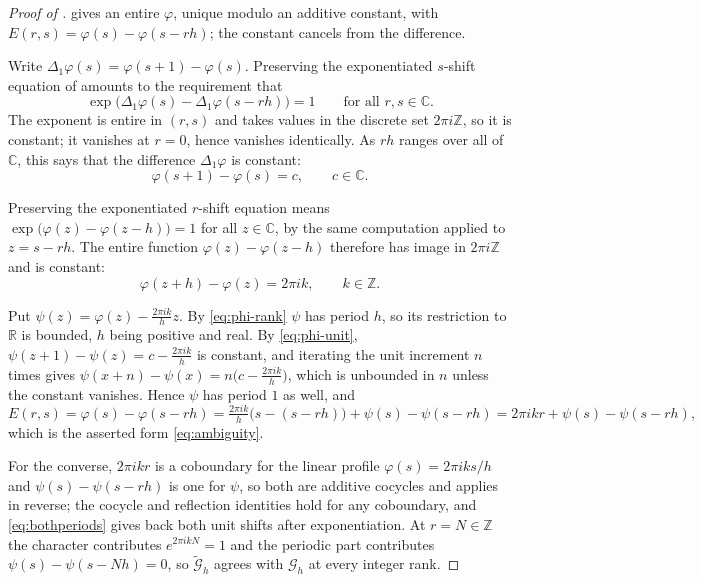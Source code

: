 \documentclass[11pt,letterpaper]{article}
\newcommand{\Gc}{\mathcal{G}}               %
\newcommand{\Zint}{\mathbb{Z}}
\newcommand{\Rr}{\mathbb{R}}
\newcommand{\Cc}{\mathbb{C}}
\begin{document}
\begin{proof}[Proof of ]
 gives an entire $\varphi$, unique modulo an additive
constant, with $E(r,s)=\varphi(s)-\varphi(s-rh)$; the constant cancels from the
difference.

Write $\Delta_1\varphi(s)=\varphi(s+1)-\varphi(s)$. Preserving the exponentiated
$s$-shift equation of  amounts to the requirement that
\begin{equation*}
  \exp\bigl(\Delta_1\varphi(s)-\Delta_1\varphi(s-rh)\bigr)=1
  \qquad\text{for all }r,s\in\Cc .
\end{equation*}
The exponent is entire in $(r,s)$ and takes values in the discrete set
$2\pi i\Zint$, so it is constant; it vanishes at $r=0$, hence vanishes
identically. As $rh$ ranges over all of $\Cc$, this says that the difference
$\Delta_1\varphi$ is constant:
\begin{equation}
  \varphi(s+1)-\varphi(s)=c,\qquad c\in\Cc .
  \label{eq:phi-unit}
\end{equation}

Preserving the exponentiated $r$-shift equation means
$\exp\bigl(\varphi(z)-\varphi(z-h)\bigr)=1$ for all $z\in\Cc$, by the same
computation applied to $z=s-rh$. The entire function $\varphi(z)-\varphi(z-h)$
therefore has image in $2\pi i\Zint$ and is constant:
\begin{equation}
  \varphi(z+h)-\varphi(z)=2\pi ik,\qquad k\in\Zint .
  \label{eq:phi-rank}
\end{equation}

Put $\psi(z)=\varphi(z)-\tfrac{2\pi ik}{h}z$. By \eqref{eq:phi-rank} $\psi$ has
period $h$, so its restriction to $\Rr$ is bounded, $h$ being positive and real.
By \eqref{eq:phi-unit},
$\psi(z+1)-\psi(z)=c-\tfrac{2\pi ik}{h}$ is constant, and iterating the unit
increment $n$ times gives $\psi(x+n)-\psi(x)=n\bigl(c-\tfrac{2\pi ik}{h}\bigr)$,
which is unbounded in $n$ unless the constant vanishes. Hence $\psi$ has period
$1$ as well, and
\begin{equation*}
  E(r,s)=\varphi(s)-\varphi(s-rh)
        =\tfrac{2\pi ik}{h}\bigl(s-(s-rh)\bigr)+\psi(s)-\psi(s-rh)
        =2\pi ikr+\psi(s)-\psi(s-rh),
\end{equation*}
which is the asserted form \eqref{eq:ambiguity}.

For the converse, $2\pi ikr$ is a coboundary for the linear profile
$\varphi(s)=2\pi iks/h$ and $\psi(s)-\psi(s-rh)$ is one for $\psi$, so both are
additive cocycles and  applies in reverse; the cocycle and
reflection identities hold for any coboundary, and \eqref{eq:bothperiods} gives
back both unit shifts after exponentiation. At $r=N\in\Zint$ the character
contributes $e^{2\pi ikN}=1$ and the periodic part contributes
$\psi(s)-\psi(s-Nh)=0$, so $\widetilde{\Gc}_h$ agrees with $\Gc_h$ at every
integer rank.


\end{proof}
\end{document}
